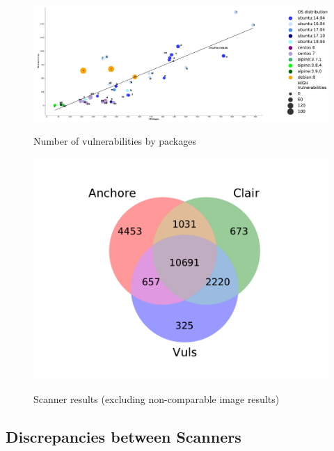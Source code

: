\documentclass[a4paper,num-refs]{oup-contemporary}
\begin{document}
\begin{figure}
        {\includegraphics[scale=1.5,width=\textwidth]
        {Figures/vulngraph.pdf}}
	\vspace*{-7mm}
        \caption{\label{fig:graph1} Number of vulnerabilities by packages}
      \end{figure}

\begin{figure}
        {\includegraphics[scale=2.5,width=\columnwidth]
        {Figures/venn.pdf}}
	\vspace*{-10mm}
	\caption{\label{fig:venn} Scanner results (excluding non-comparable image results)}
\end{figure}

\subsection{Discrepancies between Scanners}
\end{document}
